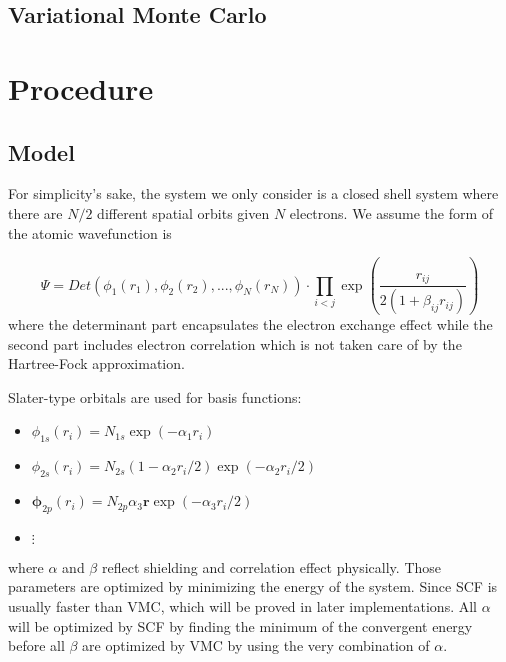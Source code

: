 \documentclass[11pt]{article}
\begin{document}
\subsection{Variational Monte Carlo}


\section{Procedure}
\subsection{Model}

For simplicity's sake, the system we only consider is a closed shell system where there are $N/2$ different spatial orbits given $N$ electrons. We assume the form of the atomic wavefunction is 

\begin{equation}
\label{eq:atomic-wavefunction}
    \Psi = Det(\phi_1(r_1), \phi_2(r_2), ..., \phi_N(r_N)) \cdot \prod_{i<j}\exp(\frac{r_{ij}}{2(1 + \beta_{ij}r_{ij})})
\end{equation}
where the determinant part encapsulates the electron exchange effect while the second part includes electron correlation which is not taken care of by the Hartree-Fock approximation. 

Slater-type orbitals are used for basis functions: \cite{hjorthcomputational}
\begin{itemize}
    \item $\phi_{1s}(r_i) = N_{1s}\exp(-\alpha_1 r_i)$
    \item $\phi_{2s}(r_i) = N_{2s}(1 - \alpha_2 r_i / 2)\exp(-\alpha_2 r_i / 2)$
    \item $\mathbf{\phi}_{2p}(r_i) = N_{2p} \alpha_3 \textbf{r} \exp(-\alpha_3 r_i/2)$
    \item $\vdots$
\end{itemize}
where $\alpha$ and $\beta$ reflect shielding and correlation effect physically. Those parameters are optimized by minimizing the energy of the system. Since SCF is usually faster than VMC, which will be proved in later implementations. All $\alpha$ will be optimized by SCF by finding the minimum of the convergent energy before all $\beta$ are optimized by VMC by using the very combination of $\alpha$.
\end{document}
